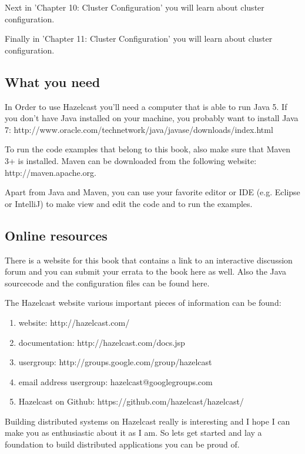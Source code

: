 Next in 'Chapter 10: Cluster Configuration' you will learn about cluster configuration.

Finally in 'Chapter 11: Cluster Configuration' you will learn about cluster configuration.

\subsection*{What you need}
In Order to use Hazelcast you'll need a computer that is able to run Java 5. If you don't have Java installed on your machine, you probably want to install Java 7: 
http://www.oracle.com/technetwork/java/javase/downloads/index.html

To run the code examples that belong to this book, also make sure that Maven 3+ is installed. Maven can be downloaded from the following website: 
http://maven.apache.org.

Apart from Java and Maven, you can use your favorite editor or IDE (e.g. Eclipse or IntelliJ) to make view and edit the code and to run the examples. 

\subsection*{Online resources}

There is a website for this book that contains a link to an interactive discussion forum and you can submit your errata to the book here as well. Also the Java sourcecode and the configuration files can be found here. 

The Hazelcast website various important pieces of information can be found:
\begin{enumerate}
\item website: http://hazelcast.com/
\item documentation: http://hazelcast.com/docs.jsp
\item usergroup: http://groups.google.com/group/hazelcast
\item email address usergroup: hazelcast@googlegroups.com
\item Hazelcast on Github: https://github.com/hazelcast/hazelcast/
\end{enumerate}

Building distributed systems on Hazelcast really is interesting and I hope I can make you as enthusiastic about it as I am. So lets get started and lay a foundation to build distributed applications you can be proud of.
